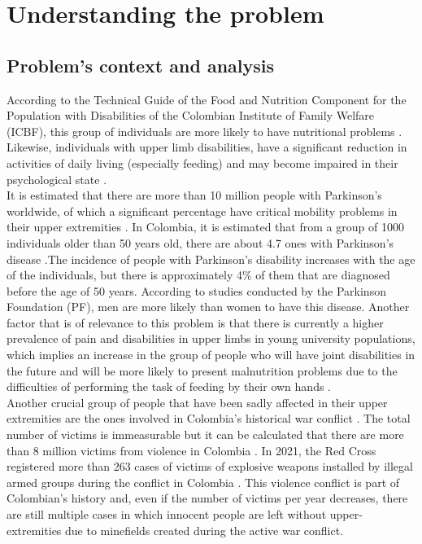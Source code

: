 \documentclass[11pt]{report} %
\begin{document}
\section{Understanding the problem}

\subsection{Problem's context and analysis}

According to the Technical Guide of the Food and Nutrition Component for the Population with Disabilities of the Colombian Institute of Family Welfare (ICBF), this group of individuals are more likely to have nutritional problems \citep{cite_ICBF_technical_article}. Likewise, individuals with upper limb disabilities, have a significant reduction in activities of daily living (especially feeding) and may become impaired in their psychological state \citep{cite_upper_limb_disabilities_self_steem}.\\

It is estimated that there are more than 10 million people with Parkinson's worldwide, of which a significant percentage have critical mobility problems in their upper extremities \citep{cite_parkinson_foundation_total_cases}. In Colombia, it is estimated that from a group of 1000 individuals older than 50 years old, there are about 4.7 ones with Parkinson's disease \citep{cite_parkinson_total_people_colombia}.The incidence of people with Parkinson's disability increases with the age of the individuals, but there is approximately 4\% of them that are diagnosed before the age of 50 years. According to studies conducted by the Parkinson Foundation (PF), men are more likely than women to have this disease. Another factor that is of relevance to this problem is that there is currently a higher prevalence of pain and disabilities in upper limbs in young university populations, which implies an increase in the group of people who will have joint disabilities in the future and will be more likely to present malnutrition problems due to the difficulties of performing the task of feeding by their own hands \citep{cite_park_active_robot_assisted_feeding}.\\

Another crucial group of people that have been sadly affected in their upper extremities are the ones involved in Colombia's historical war conflict \citep{cite_colombia_war_conflict_explained}. The total number of victims is immeasurable but it can be calculated that there are more than 8 million victims from violence in Colombia \citep{cite_colombia_war_victims}. In 2021, the Red Cross registered more than 263 cases of victims of explosive weapons installed by illegal armed groups during the conflict in Colombia \citep{cite_people_affected_from_minefields_colombia}. This violence conflict is part of Colombian's history and, even if the number of victims per year decreases, there are still multiple cases in which innocent people are left without upper-extremities due to minefields created during the active war conflict.\\
\end{document}
